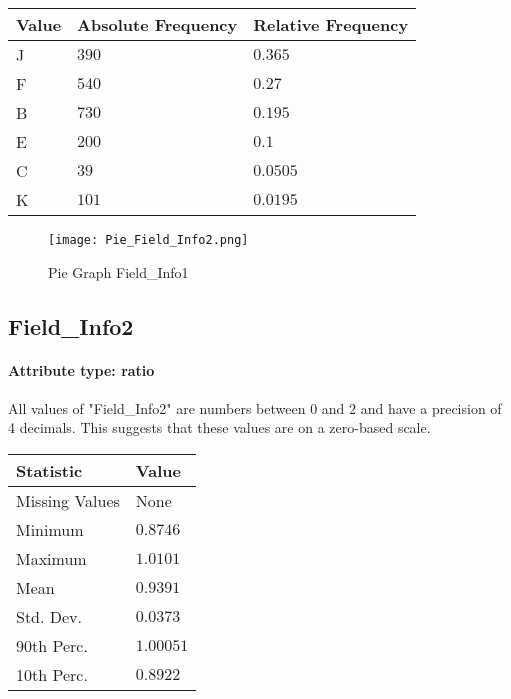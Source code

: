 \begin{table}[H]
	\renewcommand{\arraystretch}{1.25}
	\begin{tabular}{l|l|l}
		\textbf{Value} & \textbf{Absolute Frequency} & \textbf{Relative Frequency}\\\hline
			J&$390$ & $0.365$\\\hline
			F&$540$ & $0.27$\\\hline
			B&$730$ & $0.195$\\\hline
			E&$200$ & $0.1$\\\hline
			C&$39$ & $0.0505$\\\hline
			K&$101$ & $0.0195$\\
	\end{tabular}
\end{table}

\begin{figure}[H]
	\begin{center}
		\texttt{[image: Pie\_Field\_Info2.png]}
	\end{center}
	\caption{Pie Graph Field\_Info1}
\end{figure}


\subsection{Field\_Info2}
\paragraph{Attribute type: ratio}
All values of "Field\_Info2" are numbers between $0$ and $2$ and have a precision of 4 decimals. This suggests that these values are on a zero-based scale.
\begin{table}[H]
	\renewcommand{\arraystretch}{1.25}
	\begin{tabular}{l|l}
		\textbf{Statistic} & \textbf{Value}\\\hline
			Missing Values& None\\\hline
			Minimum& $0.8746$\\\hline
			Maximum& $1.0101$\\\hline
			Mean& $0.9391$\\\hline
			Std. Dev.& $0.0373$\\\hline
			90th Perc. & $1.00051$\\\hline
			10th Perc. & $0.8922$ \\
	\end{tabular}
\end{table}

